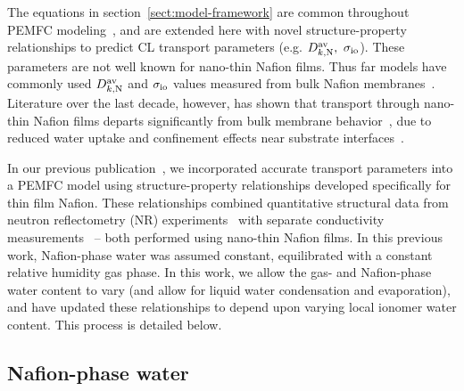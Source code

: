 \documentclass[final,3p,times,twocolumn]{elsarticle}    %
\begin{document}
The equations in section~\ref{sect:model-framework} are common throughout PEMFC modeling~\cite{bib:weber_2004, bib:weber_2014, bib:arif_2020}, and are extended here with novel structure-property relationships to predict CL transport parameters (e.g. $D_{k,\rm N}^{\rm av}, \ \sigma_{\rm io}$). These parameters are not well known for nano-thin Nafion films. Thus far models have commonly used $D_{k,\rm N}^{\rm av}$ and $\sigma_{\rm io}$ values measured from bulk Nafion membranes~\cite{bib:springer_1991, bib:weber_2004, bib:chu_2003, bib:ismail_2017, bib:aghighi_2017}. Literature over the last decade, however, has shown that transport through nano-thin Nafion films departs significantly from bulk membrane behavior~\cite{bib:decaluwe_2018, bib:paul_mccreery_2014, bib:paul_2014}, due to reduced water uptake and confinement effects near substrate interfaces~\cite{bib:dura_2009, bib:decaluwe_2018, bib:kusoglu_2012, bib:kusoglu_2017}.

In our previous publication~\cite{bib:randall_2020}, we incorporated accurate transport parameters into a PEMFC model using structure-property relationships developed specifically for thin film Nafion. These relationships combined quantitative structural data from neutron reflectometry (NR) experiments~\cite{bib:decaluwe_2018} with separate conductivity measurements~\cite{bib:paul_mccreery_2014} -- both performed using nano-thin Nafion films. In this previous work, Nafion-phase water was assumed constant, equilibrated with a constant relative humidity gas phase. In this work, we allow the gas- and Nafion-phase water content to vary (and allow for liquid water condensation and evaporation), and have updated these relationships to depend upon varying local ionomer water content. This process is detailed below.

\subsection{Nafion-phase water}
\end{document}
